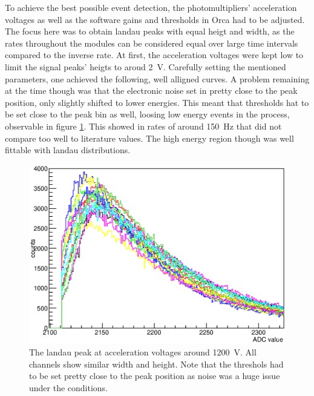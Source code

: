 	To achieve the best possible event detection, the photomultipliers' acceleration voltages as well as the software gains and thresholds in Orca had to be adjusted.
	The focus here was to obtain landau peaks with equal heigt and width, as the rates throughout the modules can be considered equal over large time intervals compared to the inverse rate.
	At first, the acceleration voltages were kept low to limit the signal peaks' heigts to aroud \SI{2}{\volt}. Carefully setting the mentioned parameters, one achieved the following, well alligned curves. A problem remaining at the time though was that the electronic noise set in pretty close to the peak position, only slightly shifted to lower energies. This meant that thresholds hat to be set close to the peak bin as well, loosing low energy events in the process, observable in figure \ref{fig:allPeaksBefore}. This showed in rates of around \SI{150}{\hertz} that did not compare too well to literature values. The high energy region though was well fittable with landau distributions.\\
	\begin{figure}
		\centering
		\includegraphics[width = 0.9 \textwidth]{graphics/setup/LandauPeaksRun660_old.eps}
		\caption{The landau peak at acceleration voltages around \SI{1200}{\volt}. All channels show similar width and height. Note that the threshols had to be set pretty close to the peak position as noise was a huge issue under the conditions.}
		\label{fig:allPeaksBefore}
	\end{figure}\\
